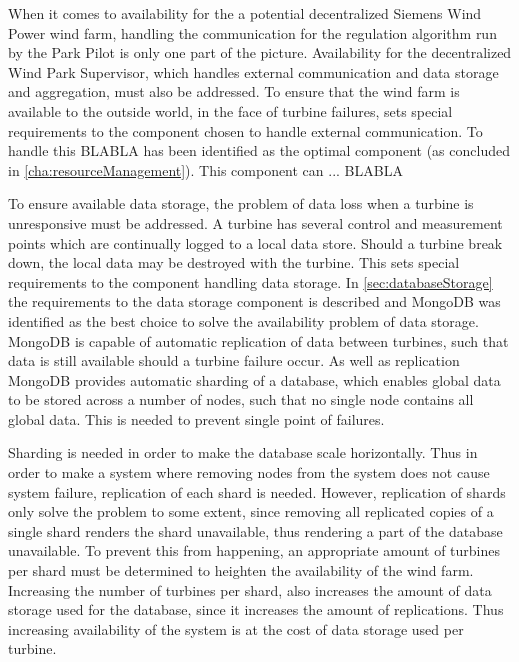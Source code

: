 
When it comes to availability for the a potential decentralized Siemens Wind Power wind farm, handling the communication for the regulation algorithm run by the Park Pilot is only one part of the picture. Availability for the decentralized Wind Park Supervisor, which handles external communication and data storage and aggregation, must also be addressed. 
To ensure that the wind farm is available to the outside world, in the face of turbine failures, sets special requirements to the component chosen to handle external communication. To handle this BLABLA  has been identified as the optimal component (as concluded in \cref{cha:resourceManagement}). This component can ... BLABLA 

To ensure available data storage, the problem of data loss when a turbine is unresponsive must be addressed. A turbine has several control and measurement points which are continually logged to a local data store. Should a turbine break down, the local data may be destroyed with the turbine. This sets special requirements to the component handling data storage. In \cref{sec:databaseStorage} the requirements to the data storage component is described and MongoDB was identified as the best choice to solve the availability problem of data storage. MongoDB is capable of automatic replication of data between turbines, such that data is still available should a turbine failure occur. As well as replication MongoDB provides automatic sharding of a database, which enables global data to be stored across a number of nodes, such that no single node contains all global data. This is needed to prevent single point of failures. 

Sharding is needed in order to make the database scale horizontally. Thus in order to make a system where removing nodes from the system does not cause system failure, replication of each shard is needed. However, replication of shards only solve the problem to some extent, since removing all replicated copies of a single shard renders the shard unavailable, thus rendering a part of the database unavailable. To prevent this from happening, an appropriate amount of turbines per shard must be determined to heighten the availability of the wind farm. Increasing the number of turbines per shard, also increases the amount of data storage used for the database, since it increases the amount of replications. Thus increasing availability of the system is at the cost of data storage used per turbine.

